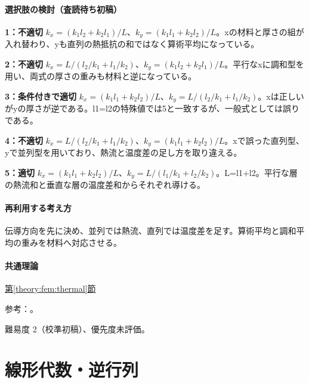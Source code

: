 \paragraph{選択肢の検討（査読待ち初稿）}\mbox{}\par

\noindent\textbf{1：不適切} \(k_x=(k_1l_2+k_2l_1)/L\)、\(k_y=(k_1l_1+k_2l_2)/L\)。xの材料と厚さの組が入れ替わり、yも直列の熱抵抗の和ではなく算術平均になっている。\par

\noindent\textbf{2：不適切} \(k_x=L/(l_2/k_1+l_1/k_2)\)、\(k_y=(k_1l_2+k_2l_1)/L\)。平行なxに調和型を用い、両式の厚さの重みも材料と逆になっている。\par

\noindent\textbf{3：条件付きで適切} \(k_x=(k_1l_1+k_2l_2)/L\)、\(k_y=L/(l_2/k_1+l_1/k_2)\)。xは正しいがyの厚さが逆である。l1=\allowbreak{}l2の特殊値では5と一致するが、一般式としては誤りである。\par

\noindent\textbf{4：不適切} \(k_x=L/(l_2/k_1+l_1/k_2)\)、\(k_y=(k_1l_1+k_2l_2)/L\)。xで誤った直列型、yで並列型を用いており、熱流と温度差の足し方を取り違える。\par

\noindent\textbf{5：適切} \(k_x=(k_1l_1+k_2l_2)/L\)、\(k_y=L/(l_1/k_1+l_2/k_2)\)。L=\allowbreak{}l1+l2。平行な層の熱流和と垂直な層の温度差和からそれぞれ導ける。\par

\paragraph{再利用する考え方} 伝導方向を先に決め、並列では熱流、直列では温度差を足す。算術平均と調和平均の重みを材料へ対応させる。

\paragraph{共通理論} \hyperref[theory:fem:thermal]{第\ref*{theory:fem:thermal}節}

\par 参考：\cite{openstax_thermal_conduction}。

\par 難易度 2（校準初稿）、優先度未評価。

\section{線形代数・逆行列}

